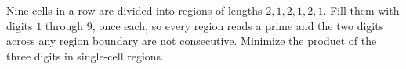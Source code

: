 Nine cells in a row are divided into regions of lengths $2,1,2,1,2,1$. Fill them with digits $1$ through $9$, once each, so every region reads a prime and the two digits across any region boundary are not consecutive. Minimize the product of the three digits in single-cell regions.
